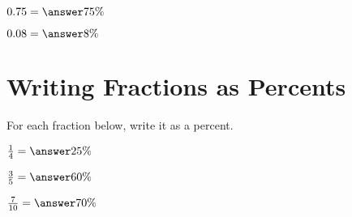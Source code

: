 \documentclass{ximera}
\begin{document}
\begin{problem}
$0.75 = \answer{75\%}$
\end{problem}

\begin{problem}
$0.08 = \answer{8\%}$
\end{problem}



\section*{Writing Fractions as Percents}

For each fraction below, write it as a percent.

\begin{problem}
$\frac{1}{4} = \answer{25\%}$
\end{problem}

\begin{problem}
$\frac{3}{5} = \answer{60\%}$
\end{problem}

\begin{problem}
$\frac{7}{10} = \answer{70\%}$
\end{problem}

\end{document}
